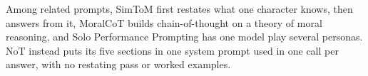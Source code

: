 Among related prompts, SimToM \citep{wilf2024simtom} first restates what
one character knows, then answers from it, MoralCoT \citep{jin22_moralcot}
builds chain-of-thought on a theory of moral reasoning, and Solo
Performance Prompting \citep{wang2024spp} has one model play several personas.
NoT instead puts its five sections in one system prompt used in one call per
answer, with no restating pass or worked examples.
